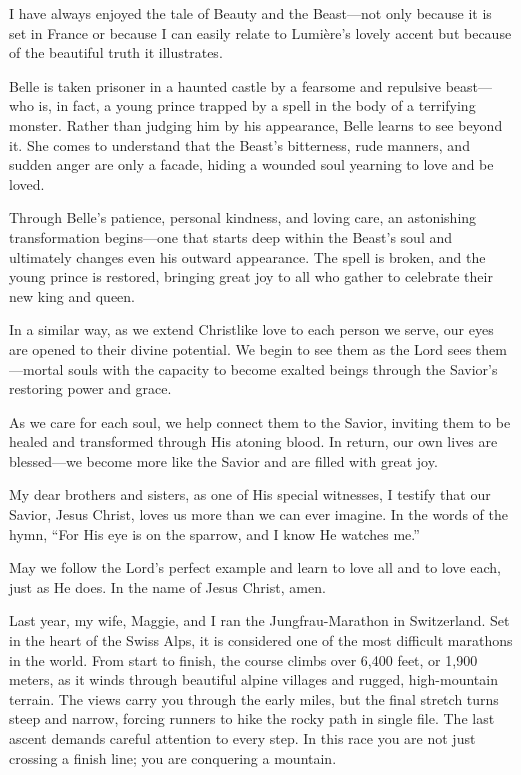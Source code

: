 \documentclass[letterpaper, 11pt]{report}
\newcommand{\speaker}{}
\newcommand{\talk}{}
\newcommand{\talkdatestr}{}
\newcommand{\setspeaker}[1]{\renewcommand{\speaker}{#1}}
\newcommand{\settalk}[1]{\renewcommand{\talk}{#1}}
\newcommand{\talkheading}[2]{%
    \vspace{1em}
    \noindent{\huge\bfseries #1}
    \par\nopagebreak\vspace{0.25em}
    \noindent{\normalsize\bfseries #2\ifx\talkdatestr\empty\else,\ \talkdatestr\fi}
    \par\nopagebreak\vspace{0.5em}
}
\begin{document}
I have always enjoyed the tale of Beauty and the Beast—not only because it is set in France or because I can easily relate to Lumière’s lovely accent but because of the beautiful truth it illustrates.

Belle is taken prisoner in a haunted castle by a fearsome and repulsive beast—who is, in fact, a young prince trapped by a spell in the body of a terrifying monster. Rather than judging him by his appearance, Belle learns to see beyond it. She comes to understand that the Beast’s bitterness, rude manners, and sudden anger are only a facade, hiding a wounded soul yearning to love and be loved.

Through Belle’s patience, personal kindness, and loving care, an astonishing transformation begins—one that starts deep within the Beast’s soul and ultimately changes even his outward appearance. The spell is broken, and the young prince is restored, bringing great joy to all who gather to celebrate their new king and queen.

In a similar way, as we extend Christlike love to each person we serve, our eyes are opened to their divine potential. We begin to see them as the Lord sees them—mortal souls with the capacity to become exalted beings through the Savior’s restoring power and grace.

As we care for each soul, we help connect them to the Savior, inviting them to be healed and transformed through His atoning blood. In return, our own lives are blessed—we become more like the Savior and are filled with great joy.

My dear brothers and sisters, as one of His special witnesses, I testify that our Savior, Jesus Christ, loves us more than we can ever imagine. In the words of the hymn, “For His eye is on the sparrow, and I know He watches me.”

May we follow the Lord’s perfect example and learn to love all and to love each, just as He does. In the name of Jesus Christ, amen.

\newpage
\settalk{Jesus Christ Is the Way}
\setspeaker{Brian J. Holmes}
\talkheading{Jesus Christ Is the Way}{Brian J. Holmes}

Last year, my wife, Maggie, and I ran the Jungfrau-Marathon in Switzerland. Set in the heart of the Swiss Alps, it is considered one of the most difficult marathons in the world. From start to finish, the course climbs over 6,400 feet, or 1,900 meters, as it winds through beautiful alpine villages and rugged, high-mountain terrain. The views carry you through the early miles, but the final stretch turns steep and narrow, forcing runners to hike the rocky path in single file. The last ascent demands careful attention to every step. In this race you are not just crossing a finish line; you are conquering a mountain.
\end{document}
